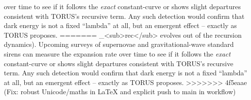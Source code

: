 \documentclass[]{article}
\begin{document}
over time to see if it follows the \emph{exact} constant-\Lambda curve or
shows slight departures consistent with TORUS's recursive
term\hspace{0pt}. Any such detection would confirm that dark energy is
not a fixed ``lambda'' at all, but an emergent effect -- exactly as
TORUS proposes.
=======
\Lambda\_\textless{}sub\textgreater{}rec\textless{}/sub\textgreater{} evolves
out of the recursion dynamics)​. Upcoming surveys of supernovae and
gravitational-wave standard sirens can measure the expansion rate over
time to see if it follows the \emph{exact} constant-\Lambda curve or shows
slight departures consistent with TORUS's recursive term​. Any such
detection would confirm that dark energy is not a fixed ``lambda'' at
all, but an emergent effect -- exactly as TORUS proposes.
>>>>>>> 4f5eaae (Fix: robust Unicode/maths in LaTeX and explicit push to main in workflow)
\end{document}
